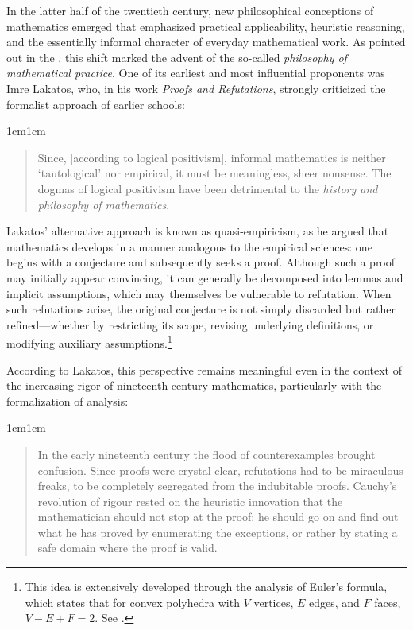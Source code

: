 \documentclass[11pt,a4paper]{book}
\theoremstyle{plain}
\begin{document}
In the latter half of the twentieth century, new philosophical conceptions of mathematics emerged that emphasized practical applicability, heuristic reasoning, and the essentially informal character of everyday mathematical work. As pointed out in the , this shift marked the advent of the so-called \textit{philosophy of mathematical practice}. One of its earliest and most influential proponents was Imre Lakatos, who, in his work \textit{Proofs and Refutations}, strongly criticized the formalist approach of earlier schools:

\begin{adjustwidth}{1cm}{1cm}
\small
\begin{quote}
Since, [according to logical positivism], informal mathematics is neither `tautological' nor empirical, it must be meaningless, sheer nonsense. The dogmas of logical positivism have been detrimental to the \textit{history and philosophy of mathematics}. \parencite[p. 2]{Lakatos1976}
\end{quote}
\end{adjustwidth}

Lakatos’ alternative approach is known as quasi-empiricism, as he argued that mathematics develops in a manner analogous to the empirical sciences: one begins with a conjecture and subsequently seeks a proof. Although such a proof may initially appear convincing, it can generally be decomposed into lemmas and implicit assumptions, which may themselves be vulnerable to refutation. When such refutations arise, the original conjecture is not simply discarded but rather refined—whether by restricting its scope, revising underlying definitions, or modifying auxiliary assumptions.\footnote{This idea is extensively developed through the analysis of Euler's formula, which states that for convex polyhedra with $V$ vertices, $E$ edges, and $F$ faces, $V - E + F = 2$. See \textcite[pp. 10–41]{Lakatos1976}.}

According to Lakatos, this perspective remains meaningful even in the context of the increasing rigor of nineteenth-century mathematics, particularly with the formalization of analysis:

\begin{adjustwidth}{1cm}{1cm}
\small
\begin{quote}
In the early nineteenth century the flood of counterexamples brought confusion. Since proofs were crystal-clear, refutations had to be miraculous freaks, to be completely segregated from the indubitable proofs. Cauchy’s revolution of rigour rested on the heuristic innovation that the mathematician should not stop at the proof: he should go on and find out what he has proved by enumerating the exceptions, or rather by stating a safe domain where the proof is valid.\parencite[p. 55]{Lakatos1976}
\end{quote}
\end{adjustwidth}
\end{document}
